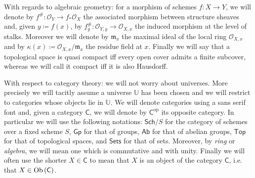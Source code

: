 With regards to algebraic geometry: for a morphism of schemes $f\colon X \to Y$,
we will denote by $f^{\#}\colon \mathcal{O}_{ Y } \to f_*\mathcal{O}_{ X }$ the
associated morphism between structure sheaves and, given $y \coloneqq f(x)$,
by $f_y^{\#}\colon \mathcal{O}_{ Y,y } \to \mathcal{O}_{ X,x }$ the induced morphism
at the level of stalks.
Moreover we will denote by $\mathfrak{m}_x$ the maximal ideal of the local ring
$\mathcal{O}_{ X,x }$ and by $\kappa(x) \coloneqq \mathcal{O}_{ X,x }/\mathfrak{m}_x$
the residue field at $x$.
Finally we will say that a topological space is quasi compact
iff every open cover admits a finite subcover, whereas
we will call it compact iff it is also Hausdorff.

With respect to category theory:
we will not worry about universes. More precisely we will
tacitly assume a universe $\mathbb{U}$ has been chosen
and we will restrict to categories whose objects lie in $\mathbb{U}$.
We will denote categories using a sans serif font and, given a category \(\mathsf{C}\),
we will denote by \(\mathsf{C}^{\mathrm{op}}\) its opposite category.
In particular we will use the following notations:
$\mathsf{Sch}/S$ for the category of schemes over 
a fixed scheme $S$,
$\mathsf{Gp}$ for that of groups,
$\mathsf{Ab}$ for that of abelian groups,
$\mathsf{Top}$ for that of topological spaces,
and $\mathsf{Sets}$ for that of sets.
Moreover, by \emph{ring} or \emph{algebra}, we will mean one which is commutative and with unity.
Finally we will often use the shorter $X \in \mathsf{C}$ to mean that $X$ is an object
of the category $\mathsf{C}$, i.e. that $X \in \operatorname{Ob} \left(\mathsf{C}\right)$.
